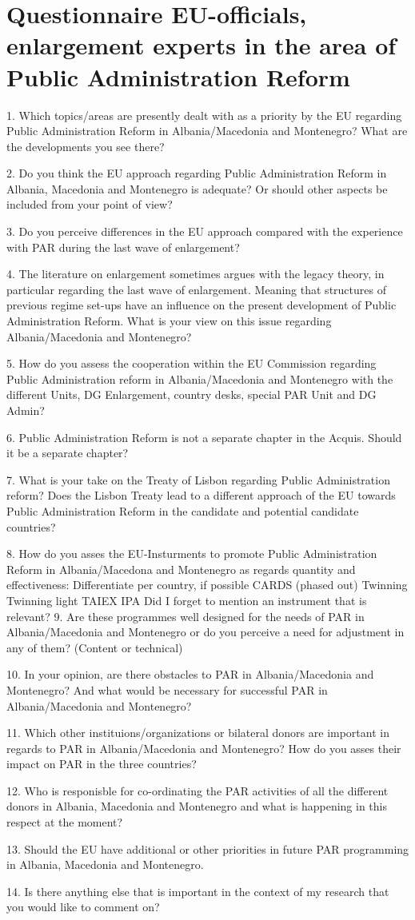 \chapter{Questionnaire EU-officials, enlargement experts in the area of Public Administration Reform }
1. Which topics/areas are presently dealt with as a priority by the EU regarding Public Administration Reform in Albania/Macedonia and Montenegro? What are the developments you see there?

2. Do you think the EU approach regarding Public Administration Reform in Albania, Macedonia and Montenegro is adequate? Or should other aspects be included from your point of view?

3. Do you perceive differences in the EU approach compared with the experience with PAR during the last wave of enlargement?

4. The literature on enlargement sometimes argues with the legacy theory, in particular regarding the last wave of enlargement. Meaning that structures of previous regime set-ups have an influence on the present development of Public Administration Reform. What is your view on this issue regarding Albania/Macedonia and Montenegro?

5. How do you assess the cooperation within the EU Commission regarding Public Administration reform in Albania/Macedonia and Montenegro with the different Units, DG Enlargement, country desks, special PAR Unit and DG Admin? 

6. Public Administration Reform is not a separate chapter in the Acquis. Should it be a separate chapter? 

7. What is your take on the Treaty of Lisbon regarding Public Administration reform? Does the Lisbon Treaty lead to a different approach of the EU towards Public Administration Reform in the candidate and potential candidate countries? 

8. How do you asses the EU-Insturments to promote Public Administration Reform in Albania/Macedona and Montenegro as regards quantity and effectiveness:
Differentiate per country, if possible
CARDS (phased out)
Twinning
Twinning light
TAIEX
IPA
Did I forget to mention an instrument that is relevant?
9. Are these programmes well designed for the needs of PAR in Albania/Macedonia and Montenegro or do you perceive a need for adjustment in any of them? (Content or technical)


10. In your opinion, are there obstacles to PAR in Albania/Macedonia and Montenegro? And what would be necessary for successful PAR in Albania/Macedonia and Montenegro? 

11. Which other instituions/organizations or bilateral donors are important in regards to PAR in Albania/Macedonia and Montenegro? How do you asses their impact on PAR in the three countries? 

12. Who is responisble for co-ordinating the PAR activities of all the different donors in Albania, Macedonia and Montenegro and what is happening in this respect at the moment? 

13. Should the EU have additional or other priorities in future PAR programming in Albania, Macedonia and Montenegro. 

14. Is there anything else that is important in the context of my research that you would like to comment on?
